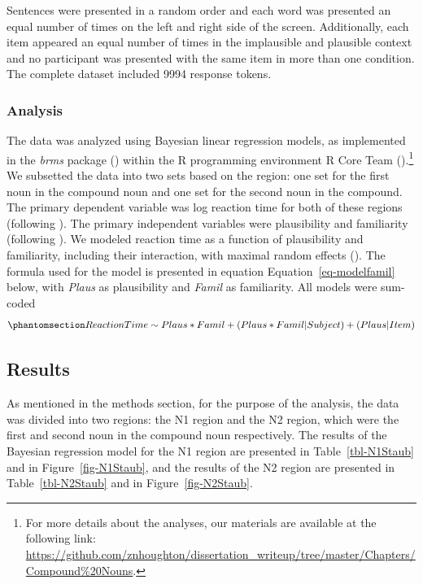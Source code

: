 \documentclass[
  12pt,
  letterpaper,
]{scrreport}
\begin{document}
Sentences were presented in a random order and each word was presented
an equal number of times on the left and right side of the screen.
Additionally, each item appeared an equal number of times in the
implausible and plausible context and no participant was presented with
the same item in more than one condition. The complete dataset included
9994 response tokens.

\subsubsection{Analysis}\label{analysis}

The data was analyzed using Bayesian linear regression models, as
implemented in the \emph{brms} package
() within
the R programming environment R Core Team
().\footnote{For more details about the
  analyses, our materials are available at the following link:
  \url{https://github.com/znhoughton/dissertation_writeup/tree/master/Chapters/Compound\%20Nouns}.}
We subsetted the data into two sets based on the region: one set for the
first noun in the compound noun and one set for the second noun in the
compound. The primary dependent variable was log reaction time for both
of these regions (following ). The primary independent variables were plausibility and
familiarity (following
). We
modeled reaction time as a function of plausibility and familiarity,
including their interaction, with maximal random effects
(). The
formula used for the model is presented in equation
Equation~\ref{eq-modelfamil} below, with \emph{Plaus} as plausibility
and \emph{Famil} as familiarity. All models were sum-coded
\begin{equation}\phantomsection\label{eq-modelfamil}{
Reaction Time \sim Plaus*Famil+(Plaus*Famil|Subject)+(Plaus|Item)
}\end{equation}

\subsection{Results}\label{results}

As mentioned in the methods section, for the purpose of the analysis,
the data was divided into two regions: the N1 region and the N2 region,
which were the first and second noun in the compound noun respectively.
The results of the Bayesian regression model for the N1 region are
presented in Table~\ref{tbl-N1Staub} and in Figure~\ref{fig-N1Staub},
and the results of the N2 region are presented in
Table~\ref{tbl-N2Staub} and in Figure~\ref{fig-N2Staub}.
\end{document}
